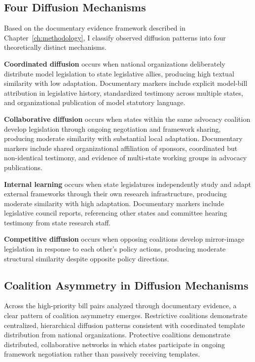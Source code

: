 \subsection{Four Diffusion Mechanisms}
\label{sec:four_mechanisms}
Based on the documentary evidence framework described in Chapter~\ref{ch:methodology}, I classify observed diffusion patterns into four theoretically distinct mechanisms.

\textbf{Coordinated diffusion} occurs when national organizations deliberately distribute model legislation to state legislative allies, producing high textual similarity with low adaptation. Documentary markers include explicit model-bill attribution in legislative history, standardized testimony across multiple states, and organizational publication of model statutory language.

\textbf{Collaborative diffusion} occurs when states within the same advocacy coalition develop legislation through ongoing negotiation and framework sharing, producing moderate similarity with substantial local adaptation. Documentary markers include shared organizational affiliation of sponsors, coordinated but non-identical testimony, and evidence of multi-state working groups in advocacy publications.

\textbf{Internal learning} occurs when state legislatures independently study and adapt external frameworks through their own research infrastructure, producing moderate similarity with high adaptation. Documentary markers include legislative council reports, referencing other states and committee hearing testimony from state research staff.

\textbf{Competitive diffusion} occurs when opposing coalitions develop mirror-image legislation in response to each other's policy actions, producing moderate structural similarity despite opposite policy directions.

\subsection{Coalition Asymmetry in Diffusion Mechanisms}
\label{sec:coalition_mechanisms}

Across the high-priority bill pairs analyzed through documentary evidence, a clear pattern of coalition asymmetry emerges. Restrictive coalitions demonstrate centralized, hierarchical diffusion patterns consistent with coordinated template distribution from national organizations. Protective coalitions demonstrate distributed, collaborative networks in which states participate in ongoing framework negotiation rather than passively receiving templates.

